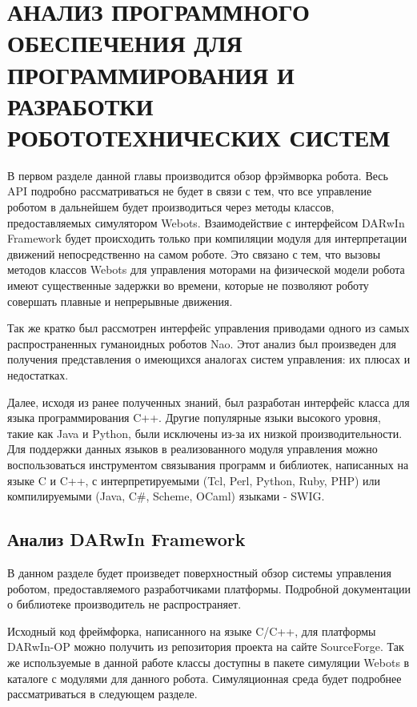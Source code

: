 \chapter{АНАЛИЗ ПРОГРАММНОГО ОБЕСПЕЧЕНИЯ ДЛЯ ПРОГРАММИРОВАНИЯ И РАЗРАБОТКИ РОБОТОТЕХНИЧЕСКИХ СИСТЕМ}

В первом разделе данной главы производится обзор фрэймворка робота. Весь API подробно рассматриваться не будет в связи с тем, что все управление роботом в дальнейшем будет производиться через методы классов, предоставляемых симулятором Webots. Взаимодействие с интерфейсом DARwIn Framework будет происходить только при компиляции модуля для интерпретации движений непосредственно на самом роботе. Это связано с тем, что вызовы методов классов Webots для управления моторами на физической модели робота имеют существенные задержки во времени, которые не позволяют роботу совершать плавные и непрерывные движения.

Так же кратко был рассмотрен интерфейс управления приводами одного из самых распространенных гуманоидных роботов Nao. Этот анализ был произведен для получения представления о имеющихся аналогах систем управления: их плюсах и недостатках.

Далее, исходя из ранее полученных знаний, был разработан интерфейс класса для языка программирования C++. Другие популярные языки высокого уровня, такие как Java и Python, были исключены из-за их низкой производительности. Для поддержки данных языков в реализованного модуля управления можно воспользоваться инструментом связывания программ и библиотек, написанных на языке C и C++, с интерпретируемыми (Tcl, Perl, Python, Ruby, PHP) или компилируемыми (Java, C\#, Scheme, OCaml) языками - SWIG\cite{beazley1997swig}.


\section{Анализ DARwIn Framework}

В данном разделе будет произведет поверхностный обзор системы управления роботом, предоставляемого разработчиками платформы. Подробной документации о библиотеке производитель не распространяет.

Исходный код фреймфорка, написанного на языке C/C++, для платформы DARwIn-OP можно получить из репозитория проекта на сайте SourceForge. Так же используемые в данной работе классы доступны в пакете симуляции Webots в каталоге с модулями для данного робота. Симуляционная среда будет подробнее рассматриваться в следующем разделе.

